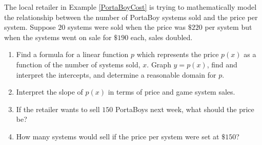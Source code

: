 \documentclass{ximera}
\begin{document}
	\author{Stitz-Zeager}
\begin{abstract}
\end{abstract}


 \begin{example}\label{PortaBoyDemand}  The local retailer in Example \ref{PortaBoyCost} is trying to mathematically model the relationship between the number of PortaBoy systems sold  and the price per system.  Suppose $20$ systems were sold when the price was  $\$220$ per system but when the systems went on sale for  $\$190$ each, sales doubled.
 
\begin{enumerate}

\item Find a formula for a linear function $p$ which represents the price $p(x)$ as a function of the number of systems sold, $x$. Graph $y = p(x)$, find and interpret the intercepts, and determine a reasonable domain for $p$.

\item Interpret the slope of $p(x)$ in terms of price and game system sales.

\item  If the retailer wants to sell $150$ PortaBoys next week, what should the price be?

\item How many systems would sell if the price per system were set at $\$150$?

\end{enumerate}



\begin{explanation}

\begin{enumerate}


\end{enumerate}
\end{explanation}
\end{example}
\end{document}
